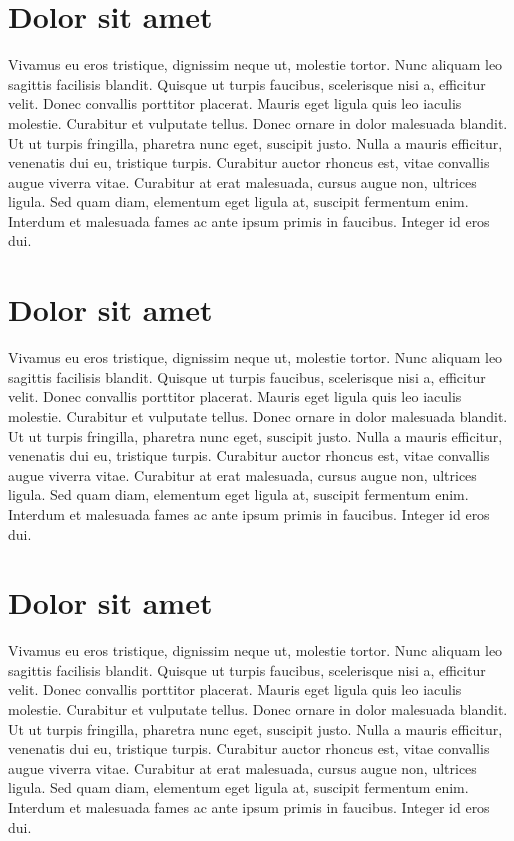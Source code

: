 \documentclass{ocsmnar}
\begin{document}
\section{Dolor sit amet}


Vivamus eu eros tristique, dignissim neque ut, molestie tortor.
Nunc aliquam leo sagittis facilisis blandit.
Quisque ut turpis faucibus, scelerisque nisi a, efficitur velit.
Donec convallis porttitor placerat.
Mauris eget ligula quis leo iaculis molestie.
Curabitur et vulputate tellus.
Donec ornare in dolor malesuada blandit.
Ut ut turpis fringilla, pharetra nunc eget, suscipit justo.
Nulla a mauris efficitur, venenatis dui eu, tristique turpis.
Curabitur auctor rhoncus est, vitae convallis augue viverra vitae.
Curabitur at erat malesuada, cursus augue non, ultrices ligula.
Sed quam diam, elementum eget ligula at, suscipit fermentum enim.
Interdum et malesuada fames ac ante ipsum primis in faucibus.
Integer id eros dui.


\section{Dolor sit amet}


Vivamus eu eros tristique, dignissim neque ut, molestie tortor.
Nunc aliquam leo sagittis facilisis blandit.
Quisque ut turpis faucibus, scelerisque nisi a, efficitur velit.
Donec convallis porttitor placerat.
Mauris eget ligula quis leo iaculis molestie.
Curabitur et vulputate tellus.
Donec ornare in dolor malesuada blandit.
Ut ut turpis fringilla, pharetra nunc eget, suscipit justo.
Nulla a mauris efficitur, venenatis dui eu, tristique turpis.
Curabitur auctor rhoncus est, vitae convallis augue viverra vitae.
Curabitur at erat malesuada, cursus augue non, ultrices ligula.
Sed quam diam, elementum eget ligula at, suscipit fermentum enim.
Interdum et malesuada fames ac ante ipsum primis in faucibus.
Integer id eros dui.


\section{Dolor sit amet}


Vivamus eu eros tristique, dignissim neque ut, molestie tortor.
Nunc aliquam leo sagittis facilisis blandit.
Quisque ut turpis faucibus, scelerisque nisi a, efficitur velit.
Donec convallis porttitor placerat.
Mauris eget ligula quis leo iaculis molestie.
Curabitur et vulputate tellus.
Donec ornare in dolor malesuada blandit.
Ut ut turpis fringilla, pharetra nunc eget, suscipit justo.
Nulla a mauris efficitur, venenatis dui eu, tristique turpis.
Curabitur auctor rhoncus est, vitae convallis augue viverra vitae.
Curabitur at erat malesuada, cursus augue non, ultrices ligula.
Sed quam diam, elementum eget ligula at, suscipit fermentum enim.
Interdum et malesuada fames ac ante ipsum primis in faucibus.
Integer id eros dui.




\end{document}
